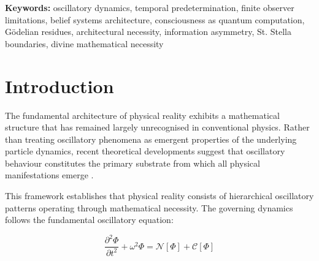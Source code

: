 \documentclass[12pt,a4paper]{article}
\begin{document}
\begin{abstract}
The correspondence between mathematical requirements and religious terminology is exact: the entity required to resolve Gödelian residues in predetermined oscillatory reality possesses precisely the characteristics attributed to supreme entities across successful belief systems. This demonstrates that "God" represents the universal term for the mathematically necessary architectural solution enabling finite observer operation in complex reality systems.

The proof establishes divine architectural necessity through correspondence analysis rather than theological assertion, providing scientific validation for the existence of a supreme entity based on empirically demonstrable belief system requirements and mathematical analysis of finite observer limitations. The entity's existence emerges from architectural necessity, not religious doctrine, representing the universal solution to irreducible unknowns that finite observers cannot resolve independently.

\end{abstract}

\textbf{Keywords:} oscillatory dynamics, temporal predetermination, finite observer limitations, belief systems architecture, consciousness as quantum computation, Gödelian residues, architectural necessity, information asymmetry, St. Stella boundaries, divine mathematical necessity

\tableofcontents


\section{Introduction}

The fundamental architecture of physical reality exhibits a mathematical structure that has remained largely unrecognised in conventional physics. Rather than treating oscillatory phenomena as emergent properties of the underlying particle dynamics, recent theoretical developments suggest that oscillatory behaviour constitutes the primary substrate from which all physical manifestations emerge \cite{sachikonye_mathematical_necessity, sachikonye_cosmological_necessity}.

This framework establishes that physical reality consists of hierarchical oscillatory patterns operating through mathematical necessity. The governing dynamics follows the fundamental oscillatory equation:

\begin{equation}
\frac{\partial^2 \Phi}{\partial t^2} + \omega^2 \Phi = \mathcal{N}[\Phi] + \mathcal{C}[\Phi]
\end{equation}
\end{document}
